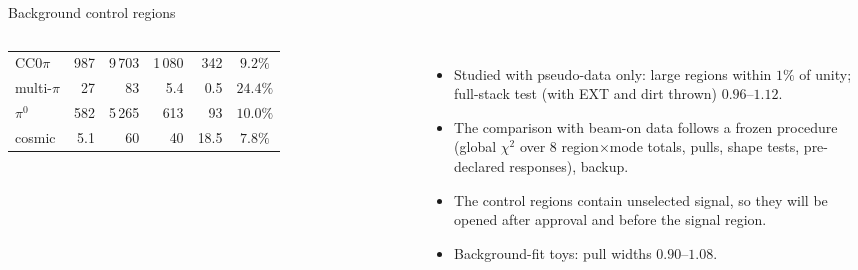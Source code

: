 \documentclass[aspectratio=169,10pt]{beamer}
\begin{document}
\begin{frame}{Background control regions}
\begin{columns}[T]
\begin{tabular}{lrrrrc}
    CC$0\pi$ & 987 & 9\,703 & 1\,080 & 342 & $9.2\%$ \\
    multi-$\pi$ & 27 & 83 & 5.4 & 0.5 & $24.4\%$ \\
    $\pi^0$ & 582 & 5\,265 & 613 & 93 & $10.0\%$ \\
    cosmic & 5.1 & 60 & 40 & 18.5 & $7.8\%$ \\
    \bottomrule
  \end{tabular}\\[2mm]
  \raggedright
  \begin{itemize}\setlength\itemsep{1pt}
    \item Studied with pseudo-data only: large regions within $1\%$ of unity; full-stack test
      (with EXT and dirt thrown) $0.96$--$1.12$.
    \item The comparison with beam-on data follows a frozen procedure (global $\chi^2$ over 8
      region$\times$mode totals, pulls, shape tests, pre-declared responses), backup.
    \item The control regions contain unselected signal, so they will be opened after approval and before the signal region.
    \item Background-fit toys: pull widths $0.90$--$1.08$.
  \end{itemize}
  \end{columns}
\end{frame}

\end{document}
